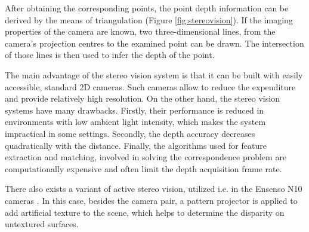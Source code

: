 After obtaining the corresponding points, the point depth information can be derived by the means of triangulation (Figure \ref{fig:stereovision}). If the imaging properties of the camera are known, two three-dimensional lines, from the camera's projection centres to the examined point can be drawn. The intersection of those lines is then used to infer the depth of the point. 

The main advantage of the stereo vision system is that it can be built with easily accessible, standard 2D cameras. Such cameras allow to reduce the expenditure and provide relatively high resolution. On the other hand, the stereo vision systems have many drawbacks. Firstly, their performance is reduced in environments with low ambient light intensity, which makes the system impractical in some settings. Secondly, the depth accuracy decreases quadratically with the distance. Finally, the algorithms used for feature extraction and matching, involved in solving the correspondence problem are computationally expensive and often limit the depth acquisition frame rate.


 There also exists a variant of active stereo vision, utilized i.e. in the Ensenso N10 cameras \cite{ensenso}. In this case, besides the camera pair, a pattern projector is applied to add artificial texture to the scene, which helps to determine the disparity on untextured surfaces.



